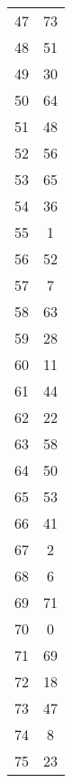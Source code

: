\begin{table}
\begin{tabular}{c c }
47 & 73 \\
48 & 51 \\
49 & 30 \\
50 & 64 \\
51 & 48 \\
52 & 56 \\
53 & 65 \\
54 & 36 \\
55 & 1 \\
56 & 52 \\
57 & 7 \\
58 & 63 \\
59 & 28 \\
60 & 11 \\
61 & 44 \\
62 & 22 \\
63 & 58 \\
64 & 50 \\
65 & 53 \\
66 & 41 \\
67 & 2 \\
68 & 6 \\
69 & 71 \\
70 & 0 \\
71 & 69 \\
72 & 18 \\
73 & 47 \\
74 & 8 \\
75 & 23 \\
\hline
\end{tabular}
\end{table}